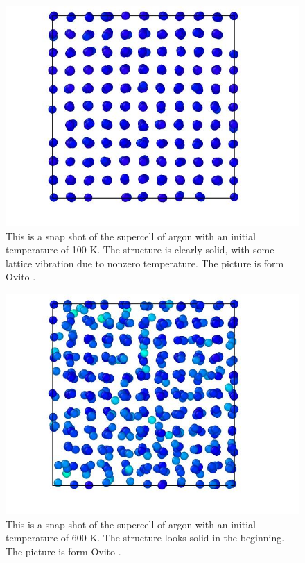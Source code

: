 \begin{multicols}{2}

\begin{figure}[H]
\includegraphics[width=\linewidth]{../figures/solid_100}\caption{This is a snap shot of the supercell of argon with an initial temperature of 100 K. The structure is clearly solid, with some lattice vibration due to nonzero temperature. The picture is form Ovito \cite{ovito}.}\label{fig:solid_100K}
\end{figure}

\begin{figure}[H]
\includegraphics[width=\linewidth]{../figures/solid_600}\caption{This is a snap shot of the supercell of argon with an initial temperature of 600 K. The structure looks solid in the beginning. The picture is form Ovito \cite{ovito}.}\label{fig:solid_600K}
\end{figure}


\end{multicols}

